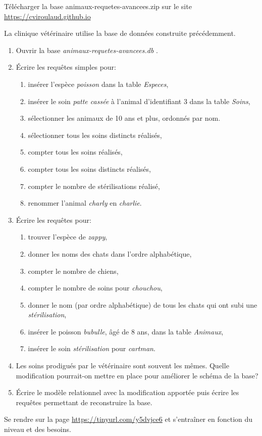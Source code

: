 \documentclass[a4paper,11pt]{article}
\begin{document}
\begin{framed}
    Télécharger la base animaux-requetes-avancees.zip sur le site \url{https://cviroulaud.github.io}
\end{framed}
\begin{exo}
La clinique vétérinaire utilise la base de données construite précédemment.
\begin{enumerate}
\item Ouvrir la base \emph{animaux-requetes-avancees.db} .
\item Écrire les requêtes simples pour:
\begin{enumerate}
\item insérer l'espèce \emph{poisson} dans la table \emph{Especes},
\item insérer le soin \emph{patte cassée} à l'animal d'identifiant 3 dans la table \emph{Soins},
\item sélectionner les animaux de 10 ans et plus, ordonnés par nom.
\item sélectionner tous les soins distincts réalisés,
\item compter tous les soins réalisés,
\item compter tous les soins distincts réalisés,
\item compter le nombre de stérilisations réalisé,
\item renommer l'animal \emph{charly} en \emph{charlie}.
\end{enumerate}
\item Écrire les requêtes pour:
\begin{enumerate}
\item trouver l'espèce de \emph{zappy},
\item donner les noms des chats dans l'ordre alphabétique,
\item compter le nombre de chiens,
\item compter le nombre de soins pour \emph{chouchou},
\item donner le nom (par ordre alphabétique) de tous les chats qui ont subi une \emph{stérilisation},
\item insérer le poisson \emph{bubulle}, âgé de 8 ans, dans la table \emph{Animaux},
\item insérer le soin \emph{stérilisation} pour \emph{cartman}.
\end{enumerate}
\item Les soins prodigués par le vétérinaire sont souvent les mêmes. Quelle modification pourrait-on mettre en place pour améliorer le schéma de la base?
\item Écrire le modèle relationnel avec la modification apportée puis écrire les requêtes permettant de reconstruire la base.
\end{enumerate}
\end{exo}
\begin{exo}
Se rendre sur la page \url{https://tinyurl.com/y5dvjce6} et s'entraîner en fonction du niveau et des besoins.
\end{exo}
\end{document}
